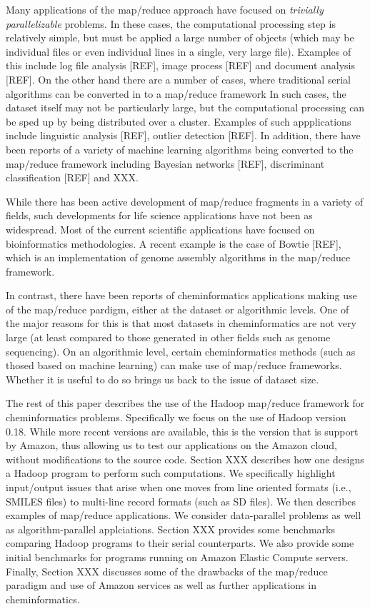 \documentclass[10pt]{bmc_article}
\newenvironment{bmcformat}{\begin{raggedright}\baselineskip20pt\sloppy\setboolean{publ}{false}}{\end{raggedright}\baselineskip20pt\sloppy}
\begin{document}
\begin{bmcformat}
Many applications of the map/reduce approach have focused on
\textit{trivially parallelizable} problems. In these cases, the
computational processing step is relatively simple, but must be
applied a large number of objects (which may be individual files or
even individual lines in a single, very large file). Examples of this
include log file analysis [REF], image process [REF] and document
analysis [REF]. On the other hand there are a number of cases, where
traditional serial algorithms can be converted in to a map/reduce
framework In such cases, the dataset itself may not be particularly
large, but the computational processing can be sped up by being
distributed over a cluster. Examples of such appplications include
linguistic analysis [REF], outlier detection [REF]. In addition, there
have been reports of a variety of machine learning algorithms being
converted to the map/reduce framework including Bayesian networks
[REF], discriminant classification [REF] and XXX.

While there has been active development of map/reduce fragments in a
variety of fields, such developments for life science applications
have not been as widespread. Most of the current scientific
applications have focused on bioinformatics methodologies. A recent
example is the case of Bowtie [REF], which is an implementation of
genome assembly algorithms in the map/reduce framework.

In contrast, there have been reports of cheminformatics applications
making use of the map/reduce pardigm, either at the dataset or
algorithmic levels. One of the major reasons for this is that most
datasets in cheminformatics are not very large (at least compared to
those generated in other fields such as genome sequencing). On an
algorithmic level, certain cheminformatics methods (such as thosed
based on machine learning) can make use of map/reduce
frameworks. Whether it is useful to do so brings us back to the issue
of dataset size.

The rest of this paper describes the use of the Hadoop map/reduce
framework for cheminformatics problems. Specifically we focus on the
use of Hadoop version 0.18. While more recent versions are available,
this is the version that is support by Amazon, thus allowing us to
test our applications on the Amazon cloud, without modifications to
the source code. Section XXX describes how one designs a Hadoop
program to perform such computations. We specifically highlight
input/output issues that arise when one moves from line oriented
formats (i.e., SMILES files) to multi-line record formats (such as SD
files). We then describes examples of map/reduce applications. We
consider data-parallel problems as well as algorithm-parallel
applciations. Section XXX provides some benchmarks comparing Hadoop
programs to their serial counterparts. We also provide some initial
benchmarks for programs running on Amazon Elastic Compute
servers. Finally, Section XXX discusses some of the drawbacks of the
map/reduce paradigm and use of Amazon services as well as further
applications in cheminformatics.



\end{bmcformat}
\end{document}

